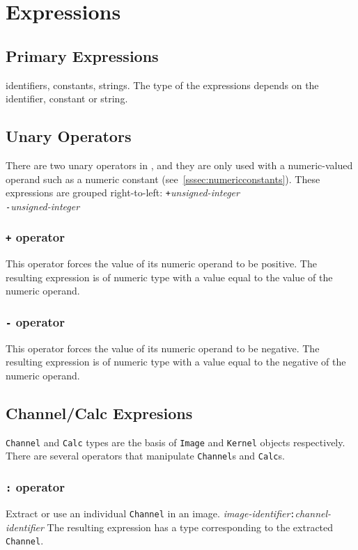 \section{Expressions}
\label{sec:expressions}

\subsection{Primary Expressions}
\label{ssec:primaryexpresions}
identifiers, constants, strings. The type of the expressions depends on the identifier, constant or string.

\subsection{Unary Operators}
\label{ssec:unaryoperators}
There are two unary operators in \sys{}, and they are only used with a
numeric-valued operand such as a numeric constant
(see~\ref{sssec:numericconstants}).
These expressions are grouped right-to-left:
\startsyn
\texttt{+}\emph{unsigned-integer} \\
\texttt{-}\emph{unsigned-integer}
\stopsyn

\subsubsection{\texttt{+} operator}
This operator forces the value of its numeric operand to be positive.
The resulting expression is of numeric type with a value equal to the
value of the numeric operand.

\subsubsection{\texttt{-} operator}
This operator forces the value of its numeric operand to be negative.
The resulting expression is of numeric type with a value equal to the
negative of the numeric operand.

\subsection{Channel/Calc Expresions}
\label{ssec:channelexpressions}
\texttt{Channel} and \texttt{Calc} types are the basis of \texttt{Image} and
\texttt{Kernel} objects respectively. There are several operators that
manipulate \texttt{Channel}s and \texttt{Calc}s.

\subsubsection{\texttt{:} operator}
\label{sssec:colonop}
Extract or use an individual \texttt{Channel} in an image.
\startsyn
\emph{image-identifier}\texttt{:}\emph{channel-identifier}
\stopsyn
The resulting expression has a type corresponding to the
extracted \texttt{Channel}.

